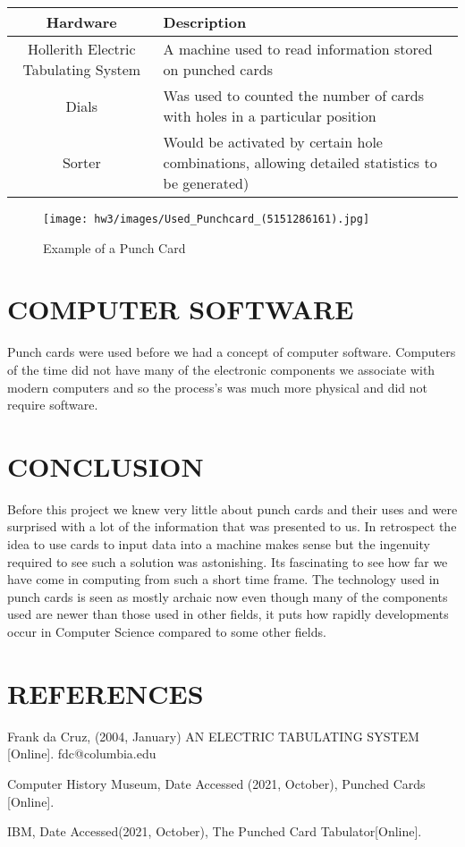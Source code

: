 \documentclass[letterpaper, 10 pt, conference]{IEEEconf}
\begin{document}
\begin{table}[h!]
\begin{center}
\begin{tabular}{||c | p{35mm} ||} 
\hline
  Hardware & Description \\
\hline\hline
Hollerith Electric Tabulating System & A machine used to read information stored on punched cards \\ 
\hline
Dials & Was used to counted the number of cards with holes in a particular position \\
\hline
Sorter & Would be activated by certain hole combinations, allowing detailed statistics to be generated) \\
\hline
\end{tabular}
\label{tbl:example}
\end{center}
\end{table}

\begin{figure}
    \centering
    \texttt{[image: hw3/images/Used\_Punchcard\_(5151286161).jpg]}
    \caption{Example of a Punch Card}
    \label{fig:my_label}
\end{figure}

\section{COMPUTER SOFTWARE}

Punch cards were used before we had a concept of computer software. Computers of the time did not have many of the electronic components we associate with modern computers and so the process's was much more physical and did not require software.

\section{CONCLUSION}

Before this project we knew very little about punch cards and their uses and were surprised with a lot of the information that was presented to us. In retrospect the idea to use cards to input data into a machine makes sense but the ingenuity required to see such a solution was astonishing. Its fascinating to see how far we have come in computing from such a short time frame. The technology used in punch cards is seen as mostly archaic now even though many of the components used are newer than those used in other fields, it puts how rapidly developments occur in Computer Science compared to some other fields.

\section*{REFERENCES}


\begin{enumerate}[label={[\arabic*]}]
\item Frank da Cruz, (2004, January) AN ELECTRIC TABULATING SYSTEM [Online]. fdc@columbia.edu
\item Computer History Museum, Date Accessed (2021, October), Punched Cards [Online]. 
\item IBM, Date Accessed(2021, October), The Punched Card Tabulator[Online].
\end{enumerate}
\end{document}
